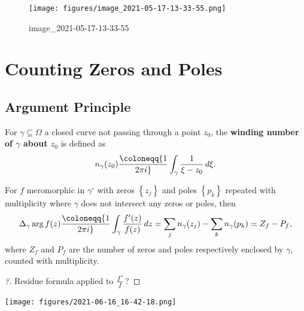 \begin{figure}
\centering
\texttt{[image: figures/image\_2021-05-17-13-33-55.png]}
\caption{image\_2021-05-17-13-33-55}
\end{figure}

\hypertarget{counting-zeros-and-poles}{%
\section{Counting Zeros and Poles}\label{counting-zeros-and-poles}}

\hypertarget{argument-principle}{%
\subsection{Argument Principle}\label{argument-principle}}

\begin{definition}

For \(\gamma \subseteq \Omega\) a closed curve not passing through a
point \(z_0\), the \textbf{winding number of \(\gamma\) about \(z_0\)}
is defined as
\begin{align*}
n_\gamma(z_0) \coloneqq{1\over 2\pi i} \int_\gamma {1\over \xi -z_0}\,d\xi
.\end{align*}

\end{definition}

\begin{theorem}

For \(f\) meromorphic in \(\gamma^\circ\) with zeros
\(\left\{{ z_j }\right\}\) and poles \(\left\{{ p_k }\right\}\) repeated
with multiplicity where \(\gamma\) does not intersect any zeros or
poles, then
\begin{align*}  
\Delta_\gamma \arg f(z) \coloneqq{1\over 2\pi i} \int_\gamma {f'(z) \over f(z)} \,dz= \sum_{j} n_\gamma(z_j) - \sum_k n_\gamma(p_k) = Z_f - P_f
,\end{align*}
where \(Z_f\) and \(P_f\) are the number of zeros and poles respectively
enclosed by \(\gamma\), counted with multiplicity.

\end{theorem}

\begin{proof}[?]

Residue formula applied to \(f'\over f\)?

\end{proof}

\texttt{[image: figures/2021-06-16\_16-42-18.png]}

